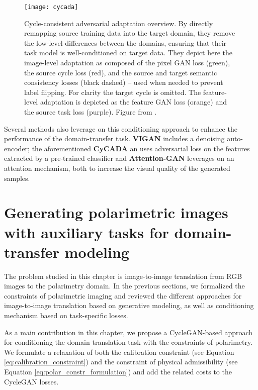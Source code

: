 \begin{figure}
	\centering
	\texttt{[image: cycada]}
	\caption[Cycle-consistent adversarial adaptation (CyCADA) overview]{Cycle-consistent adversarial adaptation overview. By directly remapping source training data into the target domain, they remove the low-level differences between the domains, ensuring that their task model is well-conditioned on target data. They depict here the image-level adaptation as composed of the pixel GAN loss ({\color{green}green}), the source cycle loss ({\color{red}red}), and the source and target semantic consistency losses (black dashed) – used when needed to prevent label flipping. For clarity the target cycle is omitted. The feature-level adaptation is depicted as the feature GAN loss ({\color{orange}orange}) and the source task loss ({\color{purple}purple}). Figure from \citet{Hoffman2018}.}
	\label{fig:cycada}
\end{figure}

Several methods also leverage on this conditioning approach to enhance the performance of the domain-transfer task. \textbf{VIGAN} \citep{Shang2017} includes a denoising auto-encoder; the aforementioned \textbf{CyCADA} an uses adversarial loss on the features extracted by a pre-trained classifier and \textbf{Attention-GAN} \citep{Chen2018b} leverages on an attention mechanism, both to increase the visual quality of the generated samples.

\section{Generating polarimetric images with auxiliary tasks for domain-transfer modeling}
\label{sec3:solutions}

The problem studied in this chapter is image-to-image translation from \ac{RGB} images to the polarimetry domain. In the previous sections, we formalized the constraints of polarimetric imaging and reviewed the different approaches for image-to-image translation based on generative modeling, as well as conditioning mechanism based on task-specific losses.

As  a main contribution in this chapter, we propose a \ac{CycleGAN}-based approach for conditioning the domain translation task with the constraints of polarimetry. We formulate a relaxation of both the calibration constraint (see Equation \ref{eq:calibration_constraint}) and the constraint of physical admissibility (see Equation \ref{eq:polar_constr_formulation}) and add the related costs to the \ac{CycleGAN} losses.

